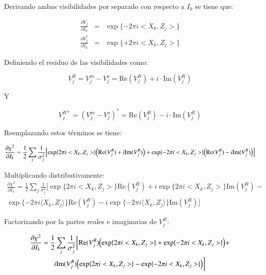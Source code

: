 Derivando ambas visibilidades por separado con respecto a $I_{k}$ se tiene que:

\begin{eqnarray}
\frac{\partial V_{j}}{\partial I_{k}} & = & \exp\{-2\pi i<X_k,Z_j>\} \\
\frac{\partial V_{j}^{*}}{\partial I_{k}} & = & \exp\{+2\pi i<X_k,Z_j>\}
\end{eqnarray}

Definiendo el residuo de las visibilidades como:

\begin{equation}
V_{j}^{R} = V_{j}^{m}-V_{j}^{o} = \text{Re}(V_{j}^{R}) + i\cdot \text{Im}(V_{j}^{R})
\end{equation}

Y

\begin{equation}
V_{j}^{R*} = (V_{j}^{m}-V_{j}^{o})^{*}=\text{Re}(V_{j}^{R})-i\cdot \text{Im}(V_{j}^{R})
\end{equation}

Reemplazando estos términos se tiene:


\begin{equation}
\frac{\partial\chi^{2}}{\partial I_{k}} = \frac{1}{2}\sum\limits_{j}\frac{1}{\sigma_{j}^{2}}\Bigl[\exp\{2\pi i<X_k,Z_j>\}\Bigl(\text{Re}(V_{j}^{R})+i\text{Im}(V_{j}^{R})\Bigr)+
              \exp\{-2\pi i<X_k,Z_j>\}\Bigl(\text{Re}(V_{j}^{R})-i\text{Im}(V_{j}^{R})\Bigr)\Bigr]
\end{equation}

Multiplicando distributivamente:
\begin{multline}
\frac{\partial\chi^{2}}{\partial I_{k}} = \frac{1}{2}\sum\limits_{j}\frac{1}{\sigma_{j}^{2}}\biggl[\exp\{2\pi i<X_k,Z_j>\}\text{Re}(V_{j}^{R})+i\exp\{2\pi i<X_k,Z_j>\}\text{Im}(V_{j}^{R})-\\
\exp\{-2\pi i \langle X_k,Z_j \rangle\}\text{Re}(V_{j}^{R})-i\exp\{-2\pi i\langle X_k,Z_j \rangle\}\text{Im}(V_{j}^{R})\biggr]
\end{multline}


Factorizando por la partes reales e imaginarias de $V_{j}^{R}$:

\begin{multline}
\frac{\partial\chi^{2}}{\partial I_{k}} = \frac{1}{2}\sum\limits_{j}\frac{1}{\sigma_{j}^{2}}\biggl[\text{Re}(V_{j}^{R})\Bigl(\exp\{2\pi i<X_k,Z_j>\}+\exp\{-2\pi i<X_k,Z_j>\}\Bigr)+ \\ i\text{Im}(V_{j}^{R})\Bigl(\exp\{2\pi i<X_k,Z_j>\}-\exp\{-2\pi i<X_k,Z_j>\}\Bigr)\biggr]
\end{multline}

